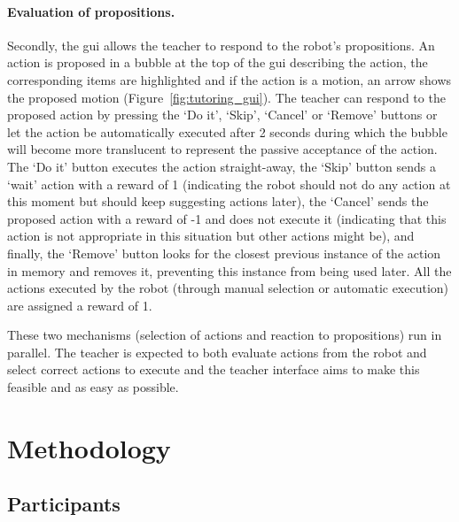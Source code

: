 \paragraph{Evaluation of propositions.} 
Secondly, the \gls{gui} allows the teacher to respond to the robot's propositions. An action is proposed in a bubble at the top of the \gls{gui} describing the action, the corresponding items are highlighted and if the action is a motion, an arrow shows the proposed motion (Figure~\ref{fig:tutoring_gui}). The teacher can respond to the proposed action by pressing the `Do it', `Skip', `Cancel' or `Remove' buttons or let the action be automatically executed after 2 seconds during which the bubble will become more translucent to represent the passive acceptance of the action. The `Do it' button executes the action straight-away, the `Skip' button sends a `wait' action with a reward of 1 (indicating the robot should not do any action at this moment but should keep suggesting actions later), the `Cancel' sends the proposed action with a reward of -1 and does not execute it (indicating that this action is not appropriate in this situation but other actions might be), and finally, the `Remove' button looks for the closest previous instance of the action in memory and removes it, preventing this instance from being used later. 
All the actions executed by the robot (through manual selection or automatic execution) are assigned a reward of 1. 

These two mechanisms (selection of actions and reaction to propositions) run in parallel. The teacher is expected to both evaluate actions from the robot and select correct actions to execute and the teacher interface aims to make this feasible and as easy as possible.

\section{Methodology}

\subsection{Participants}

